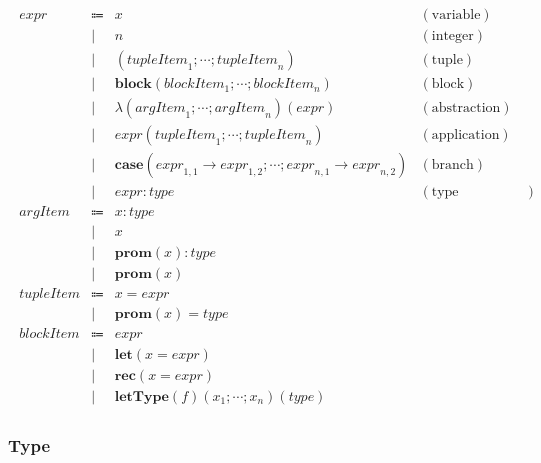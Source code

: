 \begin{align*}
  \begin{array}{rclr}
  \mathit{expr}
  & \Coloneq & x &(\text{variable}) \\
  & \mid & n &(\text{integer}) \\
  & \mid & (\mathit{tupleItem}_1; \cdots; \mathit{tupleItem}_n) &(\text{tuple}) \\
  & \mid & \mathbf{block}(\mathit{blockItem}_1; \cdots; \mathit{blockItem}_n) &(\text{block}) \\
  & \mid & \lambda(\mathit{argItem}_1; \cdots; \mathit{argItem}_n)(\mathit{expr}) &(\text{abstraction}) \\
  & \mid & \mathit{expr}(\mathit{tupleItem}_1; \cdots; \mathit{tupleItem}_n) &(\text{application}) \\
  & \mid & \mathbf{case}(\mathit{expr}_{1,1} \rightarrow \mathit{expr}_{1,2}; \cdots; \mathit{expr}_{n,1} \rightarrow \mathit{expr}_{n,2}) &(\text{branch}) \\
  & \mid & \mathit{expr}: \mathit{type} &(\text{type annotation}) \\
  \mathit{argItem}
  & \Coloneq & x: \mathit{type} \\
  & \mid & x \\
  & \mid & \mathbf{prom}(x): \mathit{type} \\
  & \mid & \mathbf{prom}(x) \\
  \mathit{tupleItem}
  & \Coloneq & x = \mathit{expr} \\
  & \mid & \mathbf{prom}(x) = \mathit{type} \\
  \mathit{blockItem}
  & \Coloneq & \mathit{expr} \\
  & \mid & \mathbf{let}(x = \mathit{expr}) \\
  & \mid & \mathbf{rec}(x = \mathit{expr}) \\
  & \mid & \mathbf{letType}(f)(x_1; \cdots; x_n)(\mathit{type})
  \end{array}
\end{align*}

\subsubsection{Type}

